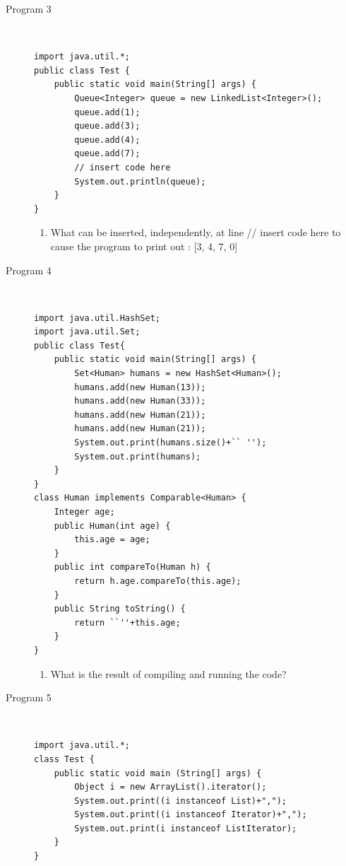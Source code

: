 \documentclass[11pt,a4paper]{article}
\def\AnswerBox{\fbox{\begin{minipage}{4in}\hfill\vspace{0.5in}\end{minipage}}}
\begin{document}
\begin{description}
\item [Program 3] \
\begin{lstlisting}
import java.util.*;
public class Test {
    public static void main(String[] args) {
        Queue<Integer> queue = new LinkedList<Integer>();
        queue.add(1);
        queue.add(3);
        queue.add(4);
        queue.add(7);
        // insert code here
        System.out.println(queue);
    }
}
\end{lstlisting}

\AnswerBox

\begin{enumerate}[label=\bfseries Q\arabic*:]\itemsep10pt
        \item What can be inserted, independently, at line // insert code here to cause the program to print out : [3, 4, 7, 0]
    \end{enumerate}

\item [Program 4] \
\begin{lstlisting}
import java.util.HashSet;
import java.util.Set;
public class Test{
    public static void main(String[] args) {
        Set<Human> humans = new HashSet<Human>();
        humans.add(new Human(13));
        humans.add(new Human(33));
        humans.add(new Human(21));
        humans.add(new Human(21));
        System.out.print(humans.size()+`` '');
        System.out.print(humans);
    }
}
class Human implements Comparable<Human> {
    Integer age;
    public Human(int age) {
        this.age = age;
    }
    public int compareTo(Human h) {
        return h.age.compareTo(this.age);
    }
    public String toString() {
        return ``''+this.age;
    }
}
\end{lstlisting}

\AnswerBox

\begin{enumerate}[label=\bfseries Q\arabic*:]\itemsep10pt
 \item What is the result of compiling and running the code?
    \end{enumerate}

\item [Program 5] \
\begin{lstlisting}
import java.util.*; 
class Test {
    public static void main (String[] args) {
        Object i = new ArrayList().iterator(); 
        System.out.print((i instanceof List)+","); 
        System.out.print((i instanceof Iterator)+","); 
        System.out.print(i instanceof ListIterator); 
    }
}
\end{lstlisting}


\end{description}
\end{document}
